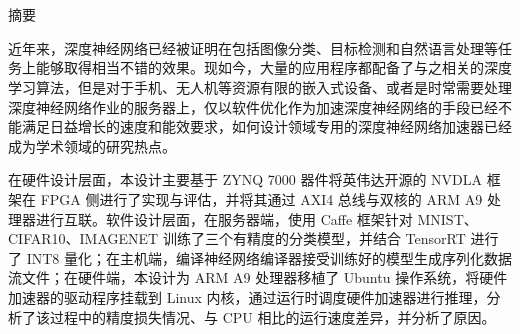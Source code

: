 \maketitle%
\chapter[摘要]{\MyTitleCh}
\setcounter{page}{1}%

\begin{center}
\vspace{-0.3cm}
 \songti 摘要
\vspace{0.3cm}
\end{center}

近年来，深度神经网络已经被证明在包括图像分类、目标检测和自然语言处理等任务上能够取得相当不错的效果。现如今，大量的应用程序都配备了与之相关的深度学习算法，但是对于手机、无人机等资源有限的嵌入式设备、或者是时常需要处理深度神经网络作业的服务器上，仅以软件优化作为加速深度神经网络的手段已经不能满足日益增长的速度和能效要求，如何设计领域专用的深度神经网络加速器已经成为学术领域的研究热点。

在硬件设计层面，本设计主要基于 ZYNQ 7000 器件将英伟达开源的 NVDLA 框架在 FPGA 侧进行了实现与评估，并将其通过 AXI4 总线与双核的 ARM A9 处理器进行互联。软件设计层面，在服务器端，使用 Caffe 框架针对 MNIST、CIFAR10、IMAGENET 训练了三个有精度的分类模型，并结合 TensorRT 进行了 INT8 量化；在主机端，编译神经网络编译器接受训练好的模型生成序列化数据流文件；在硬件端，本设计为 ARM A9 处理器移植了 Ubuntu 操作系统，将硬件加速器的驱动程序挂载到 Linux 内核，通过运行时调度硬件加速器进行推理，分析了该过程中的精度损失情况、与 CPU 相比的运行速度差异，并分析了原因。

{
}
